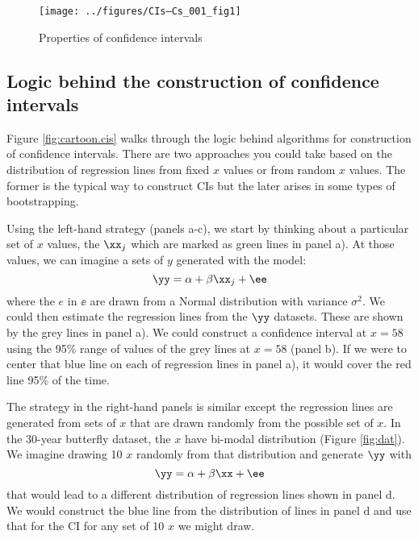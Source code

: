 \begin{figure}[htp]
\begin{center}
\texttt{[image: ../figures/CIs--Cs\_001\_fig1]}
\end{center}
\caption{Properties of confidence intervals}
\label{fig:CIs.basics}
\end{figure}

\subsection{Logic behind the construction of confidence intervals}

Figure \ref{fig:cartoon.cis} walks through the logic behind algorithms for construction of confidence intervals.  There are two approaches you could take based on the distribution of regression lines from fixed $x$ values or from random $x$ values.  The former is the typical way to construct CIs but the later arises in some types of bootstrapping.  

Using the left-hand strategy (panels a-c), we start by thinking about a particular set of $x$ values, the $\xx_j$ which are marked as green lines in panel a).  At those values, we can imagine a sets of $y$ generated with the model:
$$\yy = \alpha + \beta \xx_j + \ee$$
where the $e$ in $\ee$ are drawn from a Normal distribution with variance $\sigma^2$.  We could then estimate the regression lines from the $\yy$ datasets.  These are shown by the grey lines in panel a).  We could construct a confidence interval at $x=58$ using the 95\% range of values of the grey lines at $x=58$ (panel b).  If we were to center that blue line on each of regression lines in panel a), it would cover the red line 95\% of the time.  

The strategy in the right-hand panels is similar except the regression lines are generated from sets of $x$ that are drawn randomly from the possible set of $x$.  In the 30-year butterfly dataset, the $x$ have bi-modal distribution (Figure \ref{fig:dat}).  We  imagine drawing 10 $x$ randomly from that distribution and generate $\yy$ with
$$\yy = \alpha + \beta \xx + \ee$$
that would lead to a different distribution of regression lines shown in panel d.  We would construct the blue line from the distribution of lines in panel d and use that for the CI for any set of 10 $x$ we might draw.  

